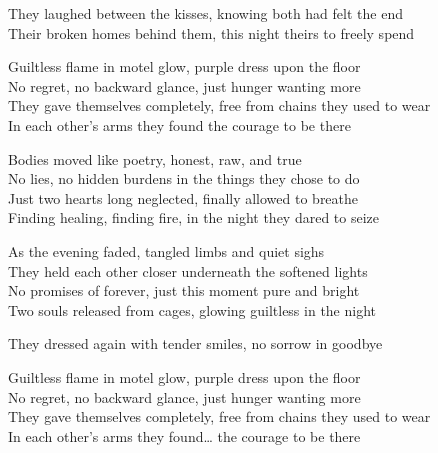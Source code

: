 \begin{lyrics}
They laughed between the kisses, knowing both had felt the end\\
Their broken homes behind them, this night theirs to freely spend

Guiltless flame in motel glow, purple dress upon the floor\\
No regret, no backward glance, just hunger wanting more\\
They gave themselves completely, free from chains they used to wear\\
In each other’s arms they found the courage to be there

Bodies moved like poetry, honest, raw, and true\\
No lies, no hidden burdens in the things they chose to do\\
Just two hearts long neglected, finally allowed to breathe\\
Finding healing, finding fire, in the night they dared to seize

As the evening faded, tangled limbs and quiet sighs\\
They held each other closer underneath the softened lights\\
No promises of forever, just this moment pure and bright\\
Two souls released from cages, glowing guiltless in the night

They dressed again with tender smiles, no sorrow in goodbye

Guiltless flame in motel glow, purple dress upon the floor\\
No regret, no backward glance, just hunger wanting more\\
They gave themselves completely, free from chains they used to wear\\
In each other’s arms they found… the courage to be there

\end{lyrics}


